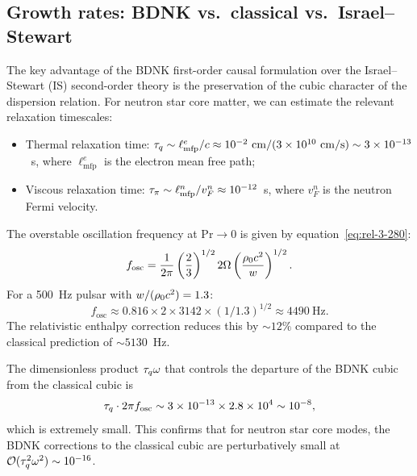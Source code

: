 \subsection{Growth rates: BDNK vs.\ classical vs.\ Israel--Stewart}

The key advantage of the BDNK first-order causal formulation over
the Israel--Stewart (IS) second-order theory is the preservation
of the cubic character of the dispersion relation.  For neutron star
core matter, we can estimate the relevant relaxation timescales:
\begin{itemize}
  \item Thermal relaxation time:
    $\tau_{q} \sim \ell_{\mathrm{mfp}}^{e}/c
    \approx 10^{-2}~\mathrm{cm} / (3 \times 10^{10}~\mathrm{cm/s})
    \sim 3 \times 10^{-13}$~s,
    where $\ell_{\mathrm{mfp}}^{e}$ is the electron mean free path;
  \item Viscous relaxation time:
    $\tau_{\pi} \sim \ell_{\mathrm{mfp}}^{n}/v_{F}^{n}
    \approx 10^{-12}$~s,
    where $v_{F}^{n}$ is the neutron Fermi velocity.
\end{itemize}

The overstable oscillation frequency at $\mathrm{Pr} \to 0$ is given
by equation~\eqref{eq:rel-3-280}:
\begin{equation}\label{eq:rel-3-app-fosc}
  f_{\mathrm{osc}}
  = \frac{1}{2\pi}\left(\frac{2}{3}\right)^{1/2}2\Omega
    \left(\frac{\rho_0 c^{2}}{w}\right)^{1/2}.
\end{equation}
For a 500~Hz pulsar with $w/(\rho_0 c^{2}) = 1.3$:
\begin{equation}\label{eq:rel-3-app-fosc-num}
  f_{\mathrm{osc}}
  \approx 0.816 \times 2 \times 3142
    \times (1/1.3)^{1/2}
  \approx 4490~\mathrm{Hz}.
\end{equation}
The relativistic enthalpy correction reduces this by $\sim 12\%$
compared to the classical prediction of $\sim 5130$~Hz.

The dimensionless product $\tau_{q} \omega$ that controls the
departure of the BDNK cubic from the classical cubic is
\begin{equation}\label{eq:rel-3-app-tauomega}
  \tau_{q} \cdot 2\pi f_{\mathrm{osc}}
  \sim 3 \times 10^{-13} \times 2.8 \times 10^{4}
  \sim 10^{-8},
\end{equation}
which is extremely small.  This confirms that for neutron star
core modes, the BDNK corrections to the classical cubic are
perturbatively small at $\mathcal{O}(\tau_{q}^{2}\omega^{2}) \sim 10^{-16}$.

